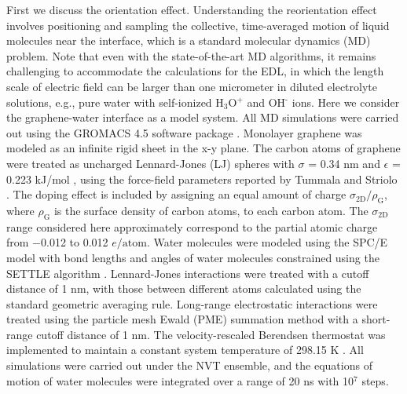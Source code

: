 First we discuss the orientation effect. Understanding the
reorientation effect involves positioning and sampling the collective,
time-averaged motion of liquid molecules near the interface, which is
a standard molecular dynamics (MD) problem. Note that even with the
state-of-the-art MD algorithms, it remains challenging to accommodate
the calculations for the EDL, in which the length scale of electric
field can be larger than one micrometer in diluted electrolyte
solutions, e.g., pure water with self-ionized H\(_{\text{3}}\)O\(^{\text{+}}\) and OH\(^{\text{-}}\)
ions. Here we consider the graphene-water interface as a model
system. All MD simulations were carried out using the GROMACS 4.5
software package \cite{Hess_2008}. Monolayer graphene was modeled as an
infinite rigid sheet in the x-y plane. The carbon atoms of graphene
were treated as uncharged Lennard-Jones (LJ) spheres with \(\sigma\) =
0.34 nm and \(\epsilon\) = 0.223 kJ/mol \cite{Cheng_1990}, using the
force-field parameters reported by Tummala and Striolo
\cite{Tummala_2008}. The doping effect is included by assigning an equal
amount of charge \(\sigma_{\mathrm{2D}} / \rho_{\mathrm{G}}\), where
\(\rho_{\mathrm{G}}\) is the surface density of carbon atoms, to each
carbon atom. The \(\sigma_{\mathrm{2D}}\) range considered here
approximately correspond to the partial atomic charge from −0.012 to
0.012 \(e/\mathrm{atom}\). Water molecules were modeled using the SPC/E
model \cite{Berendsen_1987} with bond lengths and angles of water
molecules constrained using the SETTLE algorithm
\cite{Miyamoto_1992}. Lennard-Jones interactions were treated with a
cutoff distance of 1 nm, with those between different atoms calculated
using the standard geometric averaging rule. Long-range electrostatic
interactions were treated using the particle mesh Ewald (PME)
summation method \cite{Darden_1993,Essmann_1995} with a short-range
cutoff distance of 1 nm. The velocity-rescaled Berendsen thermostat
was implemented to maintain a constant system temperature of 298.15 K
\cite{Bussi_2007}. All simulations were carried out under the NVT
ensemble, and the equations of motion of water molecules were
integrated over a range of 20 ns with 10\(^{\text{7}}\) steps.

